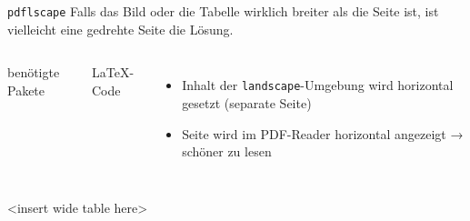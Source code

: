 \begin{frame}[fragile]{\texttt{pdflscape}}
  Falls das Bild oder die Tabelle wirklich breiter als die Seite ist, ist vielleicht eine gedrehte Seite die Lösung.
  \begin{columns}[T]
    \begin{block}{benötigte Pakete}
      \begin{lstverbatim}
      \end{lstverbatim}
    \end{block}
    \begin{block}{\LaTeX-Code}
      \begin{lstverbatim}
      \begin{landscape}
        \begin{table}
        \end{table}
      \end{landscape}
      \end{lstverbatim}
    \end{block}
    \begin{itemize}
      \item Inhalt der \texttt{landscape}-Umgebung wird horizontal gesetzt (separate Seite)
      \item Seite wird im PDF-Reader horizontal angezeigt → schöner zu lesen
    \end{itemize}
  \end{columns}
\end{frame}

\begin{landscape}
  \begin{frame}
    \centering
    <insert wide table here>
  \end{frame}
\end{landscape}

